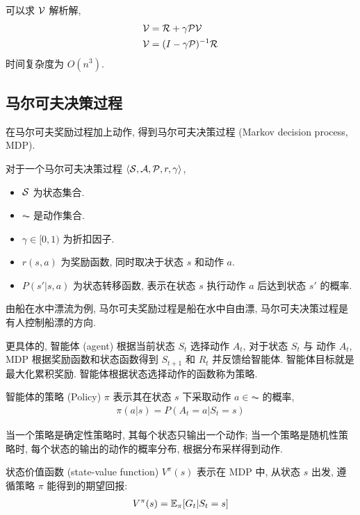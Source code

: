 可以求 $\mathcal{V}$ 解析解,
\begin{align*}
    \mathcal{V} &= \mathcal{R} + \gamma \mathcal{P} \mathcal{V}\\
    \mathcal{V} &= (I-\gamma \mathcal{P})^{-1} \mathcal{R}
\end{align*}
时间复杂度为 $O(n^3)$. 

\subsection{马尔可夫决策过程}

在马尔可夫奖励过程加上动作, 得到马尔可夫决策过程 (Markov decision process, MDP). 

\begin{definition}[马尔可夫决策过程]
    对于一个马尔可夫决策过程 $\braket{\mathcal{S}, \mathcal{A}, \mathcal{P}, r,\gamma}$,
    \begin{itemize}
        \item $\mathcal{S}$ 为状态集合.
        \item $\AC$ 是动作集合.
        \item $\gamma\in[0,1)$ 为折扣因子.
        \item $r(s,a)$ 为奖励函数, 同时取决于状态 $s$ 和动作 $a$. 
        \item $P(s'|s,a)$ 为状态转移函数, 表示在状态 $s$ 执行动作 $a$ 后达到状态 $s'$ 的概率. 
    \end{itemize}
\end{definition}

由船在水中漂流为例, 马尔可夫奖励过程是船在水中自由漂, 马尔可夫决策过程是有人控制船漂的方向. 

更具体的, 智能体 (agent) 根据当前状态 $S_t$ 选择动作 $A_t$, 对于状态 $S_t$ 与 动作 $A_t$, MDP 根据奖励函数和状态函数得到 $S_{t+1}$ 和 $R_t$ 并反馈给智能体. 智能体目标就是最大化累积奖励. 智能体根据状态选择动作的函数称为策略. 

\begin{definition}[策略]
    智能体的策略 (Policy) $\pi$ 表示其在状态 $s$ 下采取动作 $a\in\AC$ 的概率,
    \begin{align*}
        \pi(a|s) = P(A_t = a | S_t = s)
    \end{align*}
\end{definition}

当一个策略是确定性策略时, 其每个状态只输出一个动作; 当一个策略是随机性策略时, 每个状态的输出的动作的概率分布, 根据分布采样得到动作. 

\begin{definition}[状态价值函数]
    状态价值函数 (state-value function) $V^\pi(s)$ 表示在 MDP 中, 从状态 $s$ 出发, 遵循策略 $\pi$ 能得到的期望回报:
    \begin{align*}
        V^\pi(s) = \mathbb{E}_\pi [G_t | S_t= s]
    \end{align*}
\end{definition}

